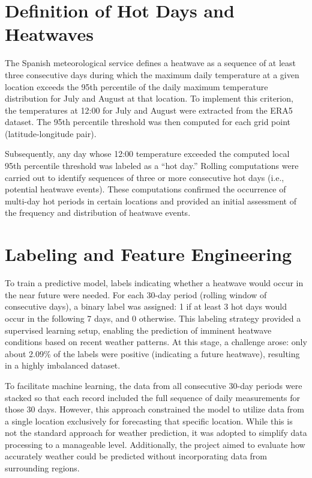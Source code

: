 \documentclass[conference,9pt]{IEEEtran}
\begin{document}
\section{Definition of Hot Days and Heatwaves}
\label{heatDef}
The Spanish meteorological service defines a heatwave as a sequence of at least three consecutive days during which the maximum daily temperature at a given location exceeds the 95th percentile of the daily maximum temperature distribution for July and August at that location. To implement this criterion, the temperatures at 12:00 for July and August were extracted from the ERA5 dataset. The 95th percentile threshold was then computed for each grid point (latitude-longitude pair).

Subsequently, any day whose 12:00 temperature exceeded the computed local 95th percentile threshold was labeled as a ``hot day.'' Rolling computations were carried out to identify sequences of three or more consecutive hot days (i.e., potential heatwave events). These computations confirmed the occurrence of multi-day hot periods in certain locations and provided an initial assessment of the frequency and distribution of heatwave events.

\section{Labeling and Feature Engineering}
To train a predictive model, labels indicating whether a heatwave would occur in the near future were needed. For each 30-day period (rolling window of consecutive days), a binary label was assigned: 1 if at least 3 hot days would occur in the following 7 days, and 0 otherwise. This labeling strategy provided a supervised learning setup, enabling the prediction of imminent heatwave conditions based on recent weather patterns. At this stage, a challenge arose: only about 2.09\% of the labels were positive (indicating a future heatwave), resulting in a highly imbalanced dataset. 

To facilitate machine learning, the data from all consecutive 30-day periods were stacked so that each record included the full sequence of daily measurements for those 30 days. However, this approach constrained the model to utilize data from a single location exclusively for forecasting that specific location. While this is not the standard approach for weather prediction, it was adopted to simplify data processing to a manageable level. Additionally, the project aimed to evaluate how accurately weather could be predicted without incorporating data from surrounding regions.
\end{document}
